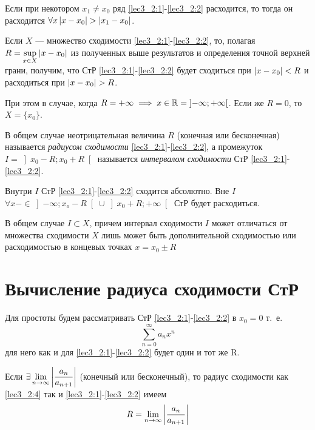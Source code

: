\documentclass[../../main.tex]{subfiles}
\begin{document}
\begin{crl*}
	Если при некотором $x_1 \ne x_0$ ряд \eqref{lec3_2:1}-\eqref{lec3_2:2}
	 расходится, то тогда он расходится $\forall x \left|{x-x_0}\right| > \left|{x_1-x_0}\right|$.
\end{crl*}	
\begin{rem}
	Если $X$ --- множество сходимости \eqref{lec3_2:1}-\eqref{lec3_2:2}, 
	то, полагая $R=\underset{x\in X}{\sup} \left|{x-x_0}\right|$ из полученных выше 
	результатов и определения точной верхней грани, получим, 
	что СтР \eqref{lec3_2:1}-\eqref{lec3_2:2}
	будет сходиться при $\left|{x-x_0}\right| < R$ и расходиться при $\abs{x-x_0}>R$.
	
	При этом в случае, когда $R=+\infty \implies 
	x \in \mathbb{R}=\left]-\infty;+\infty\right[$.
	Если же $R=0$, то $X=\{x_0\}$.	
\end{rem}	
В общем  случае неотрицательная величина $R$ (конечная или бесконечная) 
называется \emph{радиусом сходимости}  \eqref{lec3_2:1}-\eqref{lec3_2:2}, а 
промежуток $I=\left]x_0-R;x_0+R\right[$ называется 
\emph{интервалом сходимости} 
СтР \eqref{lec3_2:1}-\eqref{lec3_2:2}.
	
Внутри $I$ СтР \eqref{lec3_2:1}-\eqref{lec3_2:2} сходится абсолютно. Вне $I$
$\forall x-\in\left]-\infty;x_o-R\right[\cup\left]x_0+R;+\infty\right[$
СтР будет расходиться.
	 
В общем случае $I\subset X$, причем интервал сходимости $I$ может
отличаться от множества сходимости $X$ лишь может быть дополнительной 
сходимостью или расходимостью в концевых точках $x=x_0\pm R$
	 
\section{Вычисление радиуса сходимости СтР}
	
Для простоты будем рассматривать СтР \eqref{lec3_2:1}-\eqref{lec3_2:2} в 
$x_0=0$
т.~е. 
\begin{equation}\label{lec3_2:4}
	\sum_{n=0}^{\infty}a_nx^n
\end{equation}
для него как и для \eqref{lec3_2:1}-\eqref{lec3_2:2} будет один и тот же
R.
\begin{thm}
	Если $\exists \lim\limits_{n\to\infty} \left|{\dfrac{a_n}{a_{n+1}}}\right|$ (конечный 
	или 
	бесконечный), то радиус сходимости как \eqref{lec3_2:4} так и 
	\eqref{lec3_2:1}-\eqref{lec3_2:2} имеем
	\begin{equation}
		R=\lim\limits_{n\rightarrow\infty}
		\left|{\frac{a_n}{a_{n+1}}}\right|
		\label{lec3_2:5}
	\end{equation}
\end{thm}	
\end{document}
